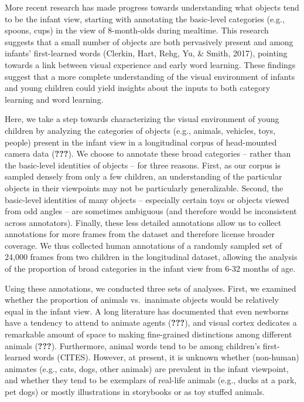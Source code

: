 \documentclass[10pt, letterpaper]{article}
\begin{document}
More recent research has made progress towards understanding what
objects tend to be the infant view, starting with annotating the
basic-level categories (e.g., spoons, cups) in the view of 8-month-olds
during mealtime. This research suggests that a small number of objects
are both pervasively present and among infants' first-learned words
(Clerkin, Hart, Rehg, Yu, \& Smith, 2017), pointing towards a link
between visual experience and early word learning. These findings
suggest that a more complete understanding of the visual environment of
infants and young children could yield insights about the inputs to both
category learning and word learning.

Here, we take a step towards characterizing the visual environment of
young children by analyzing the categories of objects (e.g., animals,
vehicles, toys, people) present in the infant view in a longitudinal
corpus of head-mounted camera data ({\textbf{???}}). We choose to
annotate these broad categories -- rather than the basic-level
identities of objects -- for three reasons. First, as our corpus is
sampled densely from only a few children, an understanding of the
particular objects in their viewpoints may not be particularly
generalizable. Second, the basic-level identities of many objects --
especially certain toys or objects viewed from odd angles -- are
sometimes ambiguous (and therefore would be inconsistent across
annotators). Finally, these less detailed annotations allow us to
collect annotations for more frames from the dataset and therefore
license broader coverage. We thus collected human annotations of a
randomly sampled set of 24,000 frames from two children in the
longitudinal dataset, allowing the analysis of the proportion of broad
categories in the infant view from 6-32 months of age.

Using these annotations, we conducted three sets of analyses. First, we
examined whether the proportion of animals vs.~inanimate objects would
be relatively equal in the infant view. A long literature has documented
that even newborns have a tendency to attend to animate agents
({\textbf{???}}), and visual cortex dedicates a remarkable amount of
space to making fine-grained distinctions among different animals
({\textbf{???}}). Furthermore, animal words tend to be among children's
first-learned words (CITES). However, at present, it is unknown whether
(non-human) animates (e.g., cats, dogs, other animals) are prevalent in
the infant viewpoint, and whether they tend to be exemplars of real-life
animals (e.g., ducks at a park, pet dogs) or mostly illustrations in
storybooks or as toy stuffed animals.
\end{document}
